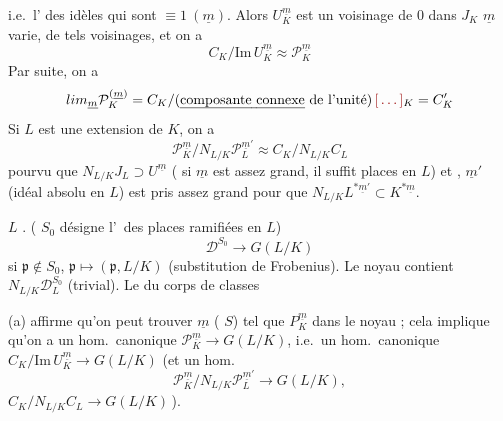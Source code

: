 \documentclass[11pt,a4paper]{article}
\begin{document}
i.e.\ l' des idèles qui sont $\equiv 1\ (\underline{m})$.
Alors $U^{\underline{m}}_{K}$ est un voisinage  de $0$ dans
$J_K$ \ill{} \ill{} \ill{} $\underline{m}$ varie, \ill{} \ill{} \ill{}
 de tels voisinages, et \struck{\ill{}} \ill{} on a
\[
C_K/\mathrm{Im}\,U^{\underline{m}}_{K} \approx \mathcal{P}^{\underline{m}}_{K}
\]
Par suite, on a
\[
\varprojlim_{\underline{m}} \mathcal{P}^{(\underline{m})}_{K} = C_K/(\text{\uncertain{composante connexe} de l'unité})\,\ill{}_K = C'_K
\]
Si $L$ est une extension   de
$K$, on a
\[
\mathcal{P}^{\underline{m}}_{K}/N_{L/K}\mathcal{P}^{\underline{m}'}_{L} \approx C_K/N_{L/K}C_L
\]
pourvu que $N_{L/K}J_L \supset U^{\underline{m}}$ (
si $\underline{m}$ est assez grand, \ill{} il suffit \ill{} \ill{} \ill{}
\ill{} \ill{} \ill{}  \ill{} \ill{} places
 en $L$) et \ill{} \ill{} \ill{}, $\underline{m}'$
(idéal absolu en $L$) est pris assez grand pour que
$N_{L/K}L^{*\underline{m}'} \subset K^{*\underline{m}}$.

 $L$ . \ill{} \ill{} \ill{}
 ( $S_0$ désigne l'\ des
places  ramifiées  en $L$)
\[
\mathcal{D}^{S_0} \to G(L/K)
\]
 si $\mathfrak{p} \notin S_0$,
$\mathfrak{p} \mapsto (\mathfrak{p}, L/K)$ (substitution de Frobenius). Le
noyau contient  $N_{L/K}\mathcal{D}^{S_0}_{L}$ (trivial). Le
 du corps de classes

(a) affirme qu'on peut trouver $\underline{m}$ (
$S$) tel que  $P^{\underline{m}}_{K}$ 
dans le noyau ; cela implique qu'on a un hom.\ canonique
$\mathcal{P}^{\underline{m}}_{K} \to G(L/K)$, i.e.\ un hom.\ canonique
$C_K/\mathrm{Im}\,U^{\underline{m}}_{K} \to G(L/K)$
(et  un hom.
\[
\mathcal{P}^{\underline{m}}_{K}/N_{L/K}\mathcal{P}^{\underline{m}'}_{L} \to G(L/K),
\]
 $C_K/N_{L/K}C_L \to G(L/K)$\,).
\end{document}
